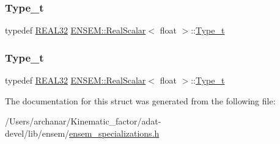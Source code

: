 \mbox{\label{structENSEM_1_1RealScalar_3_01float_01_4_a897db3180e57c127ea66a260ac1d0bc4}} 
\subsubsection{\texorpdfstring{Type\_t}{Type\_t}\hspace{0.1cm}{\footnotesize\ttfamily [2/3]}}
{\footnotesize\ttfamily typedef \mbox{\hyperlink{namespaceENSEM_a7540d01191172323e9073283d772576d}{R\+E\+A\+L32}} \mbox{\hyperlink{structENSEM_1_1RealScalar}{E\+N\+S\+E\+M\+::\+Real\+Scalar}}$<$ float $>$\+::\mbox{\hyperlink{structENSEM_1_1RealScalar_3_01float_01_4_a897db3180e57c127ea66a260ac1d0bc4}{Type\+\_\+t}}}

\mbox{\label{structENSEM_1_1RealScalar_3_01float_01_4_a897db3180e57c127ea66a260ac1d0bc4}} 
\subsubsection{\texorpdfstring{Type\_t}{Type\_t}\hspace{0.1cm}{\footnotesize\ttfamily [3/3]}}
{\footnotesize\ttfamily typedef \mbox{\hyperlink{namespaceENSEM_a7540d01191172323e9073283d772576d}{R\+E\+A\+L32}} \mbox{\hyperlink{structENSEM_1_1RealScalar}{E\+N\+S\+E\+M\+::\+Real\+Scalar}}$<$ float $>$\+::\mbox{\hyperlink{structENSEM_1_1RealScalar_3_01float_01_4_a897db3180e57c127ea66a260ac1d0bc4}{Type\+\_\+t}}}



The documentation for this struct was generated from the following file\+:\begin{DoxyCompactItemize}
\item 
/\+Users/archanar/\+Kinematic\+\_\+factor/adat-\/devel/lib/ensem/\mbox{\hyperlink{adat-devel_2lib_2ensem_2ensem__specializations_8h}{ensem\+\_\+specializations.\+h}}\end{DoxyCompactItemize}
